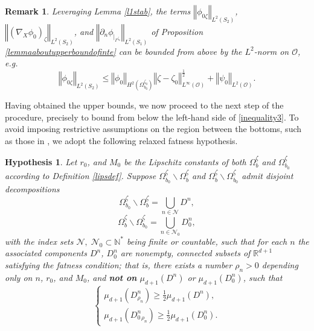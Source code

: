 \documentclass[11pt]{article}
\newtheorem{remark}[theorem]{Remark}
\newtheorem{hyp}[theorem]{Hypothesis}
\begin{document}
\begin{remark}\label{terms-in-O}
Leveraging Lemma \ref{l1stab}, the terms $\left\Vert \phi_{0\zeta} \right\Vert_{L^2(S_2)}$, $\left\Vert  (\nabla_X\phi_0)_{\zeta}\right\Vert_{L^2(S_2)}$, and $\left\Vert \partial_n\phi_{|_{\Gamma^{\zeta_0}}} \right\Vert_{L^2(S_1)}$  of Proposition \ref{lemmaaboutupperboundofinte} can be bounded from above by the $L^{2}$-norm on $\mathcal O$,  e.g.
    $$\left\Vert \phi_{0\zeta} \right\Vert_{L^2(S_2)} \leq \left\Vert  \phi_0  \right\Vert_{H ^2(\Omega_ {b_0}^{\zeta_0})} \left\Vert \zeta-\zeta_0  \right\Vert^{\frac{1}{2}}_{L^{\infty}(\mathcal O)}+\left\Vert \psi_0 \right\Vert_{L^2(\mathcal O)}.$$
\end{remark} 
Having obtained the upper bounds, we now proceed to the next step of the procedure, precisely to bound from below the left-hand side of \eqref{inequality3}. To avoid imposing restrictive assumptions on the region between the bottoms, such as those in \cite{lecaros2020stability}, we adopt the following relaxed fatness hypothesis. 
\begin{hyp}\label{hyp-of-paper}
    Let $r_0$, and $M_0$ be the Lipschitz constants of both $\Omega^{\underline{\zeta}}_{b}$ and $\Omega^{\underline{\zeta}}_{b_0}$ according to Definition \ref{lipsdef}. Suppose $\Omega_{b_0}^{\underline{\zeta}}\backslash \Omega_{b}^{\underline{\zeta}}$  and $\Omega_{b}^{\underline{\zeta}}\backslash \Omega_{b_0}^{\underline{\zeta}}$ admit disjoint decompositions
 $$\Omega_{b_0}^{\underline{\zeta}}\backslash \Omega_{b}^{\underline{\zeta}}=\bigcup_{n\in \mathcal N}D^n,$$
 $$\Omega_{b}^{\underline{\zeta}}\backslash \Omega_{b_0}^{\underline{\zeta}}=\bigcup_{n\in \mathcal N_0}D^n_0,$$
with the index sets  ${\mathcal N},\; {\mathcal N_0}\subset {\mathbb N}^*$ being finite or countable, such that for each $n$ the associated components $D^n$, $ D^n_0$ are nonempty, connected subsets of $\mathbb{R}^{d+1}$  satisfying the fatness condition; that is, there exists a number
 $\rho_n>0$ depending only on $n$, $r_0$, and $M_0$,  and {\bf not on} $\mu_{d+1}(D^n)$ or $\mu_{d+1}(D_0^n)$, such that
\begin{equation}\label{hypfatness}
\left\{
    \begin{array}{ll}
		\mu_{d+1} (D^n_{\rho_n})\geq\frac{1}{2}\mu_{d+1} (D^n),\\
        \mu_{d+1} (D^n_{0\,\rho_n})\geq\frac{1}{2}\mu_{d+1} (D^n_0).
    \end{array}
    \right.
\end{equation}
\end{hyp}
\end{document}
